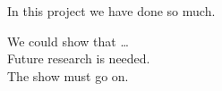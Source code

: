 \label{chap:6_conclusion}
In this project we have done so much.

We could show that \ldots \\

Future research is needed.\\
The show must go on.